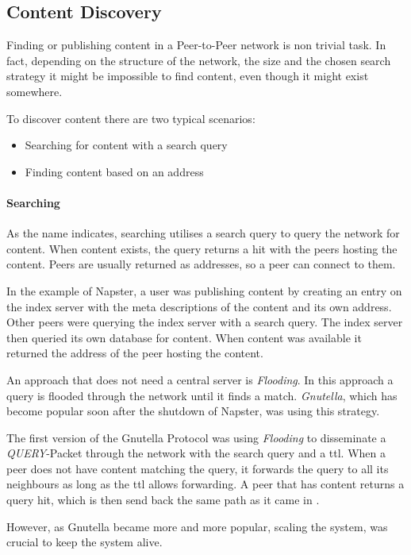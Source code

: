 \subsection{Content Discovery}
Finding or publishing content in a Peer-to-Peer network is non trivial task. In fact, depending on the structure of the network, the size and the chosen search strategy it might be impossible to find content, even though it might exist somewhere.

To discover content there are two typical scenarios:
\begin{itemize}
  \item Searching for content with a search query
  \item Finding content based on an address
\end{itemize}

\paragraph{Searching}
As the name indicates, searching utilises a search query to query the network for content. When content exists, the query returns a hit with the peers hosting the content. Peers are usually returned as addresses, so a peer can connect to them.

In the example of Napster, a user was publishing content by creating an entry on the index server with the meta descriptions of the content and its own address. Other peers were querying the index server with a search query. The index server then queried its own database for content. When content was available it returned the address of the peer hosting the content. 

An approach that does not need a central server is \textit{Flooding}. In this approach a query is flooded through the network until it finds a match. \textit{Gnutella}, which has become popular soon after the shutdown of Napster, was using this strategy.

The first version of the Gnutella Protocol was using \textit{Flooding} to disseminate a \textit{QUERY}-Packet through the network with the search query and a \gls{ttl}. When a peer does not have content matching the query, it forwards the query to all its neighbours as long as the \gls{ttl} allows forwarding. A peer that has content returns a query hit, which is then send back the same path as it came in \cite[\S4]{gnutella04}.

However, as Gnutella became more and more popular, scaling the system, was crucial to keep the system alive.  \cite[\S3.1]{gnutellaAnalysis}

